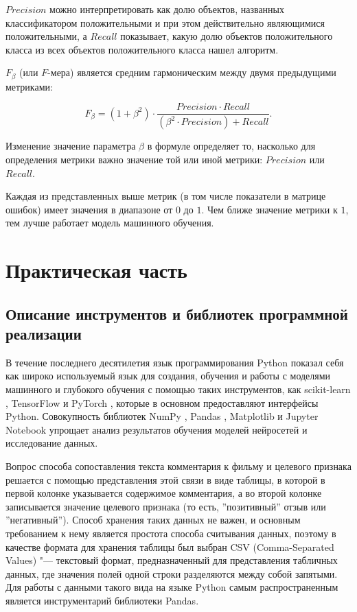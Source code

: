 \documentclass[bachelor, och, coursework]{SCWorks}
\begin{document}
        $Precision$ можно интерпретировать как долю объектов, названных
        классификатором положительными и при этом действительно являющимися
        положительными, а $Recall$ показывает, какую долю объектов
        положительного класса из всех объектов положительного класса нашел
        алгоритм.

        $F_\beta$ (или $F$-мера) является средним гармоническим между двумя
        предыдущими метриками:

        \begin{equation}
            F_\beta = (1 + \beta^2) \cdot \frac{Precision \cdot
            Recall}{(\beta^2 \cdot Precision) + Recall}.         
        \end{equation}

        Изменение значение параметра $\beta$ в формуле определяет то, насколько
        для определения метрики важно значение той или иной метрики: $Precision$
        или $Recall$.

        Каждая из представленных выше метрик (в том числе показатели в матрице
        ошибок) имеет значения в диапазоне от $0$ до $1$. Чем ближе значение
        метрики к $1$, тем лучше работает модель машинного обучения.


\section{Практическая часть}

    \subsection{Описание инструментов и библиотек программной реализации}

        В течение последнего десятилетия язык программирования Python показал
        себя как широко используемый язык для создания, обучения и работы с
        моделями машинного и глубокого обучения с помощью таких инструментов,
        как scikit-learn \cite{fwsl}, TensorFlow \cite{fwtf} и PyTorch
        \cite{fwpytorch}, которые в основном предоставляют интерфейсы Python.
        Совокупность библиотек NumPy \cite{fwnumpy}, Pandas \cite{fwpandas},
        Matplotlib \cite{fwmatplotlib} и Jupyter Notebook \cite{fwjupyter}
        упрощает анализ результатов обучения моделей нейросетей и исследование
        данных.

        Вопрос способа сопоставления текста комментария к фильму и целевого
        признака решается с помощью представления этой связи в виде таблицы, в
        которой в первой колонке указывается содержимое комментария, а во второй
        колонке записывается значение целевого признака (то есть, ''позитивный''
        отзыв или ''негативный''). Способ хранения таких данных не важен, и
        основным требованием к нему является простота способа считывания данных,
        поэтому в качестве формата для хранения таблицы был выбран CSV
        (Comma-Separated Values) "--- текстовый формат, предназначенный для
        представления табличных данных, где значения полей одной строки
        разделяются между собой запятыми. Для работы с данными такого вида на
        языке Python самым распространенным является инструментарий библиотеки
        Pandas.
\end{document}
